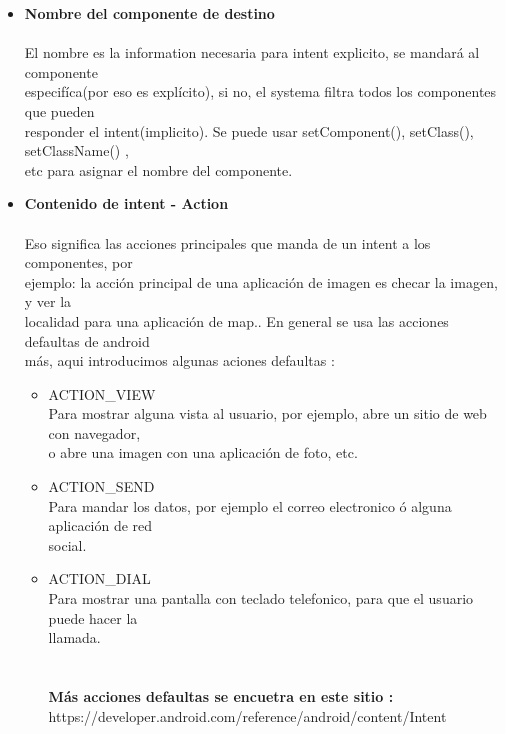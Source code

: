 \documentclass[a4paper]{article}
\begin{document}
\begin{itemize}
\item \textbf{Nombre del componente de destino} \\ \\
El nombre es la information necesaria para intent explicito, se mandará al componente \\[0.3em] especifíca(por eso es explícito), si no, el systema filtra todos los componentes que pueden \\[0.3em] responder el intent(implicito). Se puede usar setComponent(), setClass(), setClassName() , \\[0.3em] etc para asignar el nombre del componente. \\ 

\item \textbf{Contenido de intent - Action} \\ \\
Eso significa las acciones principales que manda de un intent a los componentes, por \\[0.3em] ejemplo: la acción principal de una aplicación de imagen es 
checar la imagen, y ver la \\[0.3em] localidad para una aplicación de map.. En general se usa las acciones defaultas de android \\[0.3em] más, aqui introducimos algunas aciones defaultas :

\begin{itemize}
  \item{ACTION\_VIEW}  \\[0.6em] 
Para mostrar alguna vista al usuario, por ejemplo, abre un sitio de web con navegador, \\[0.3em] o  abre una imagen con una aplicación de foto, etc.
   \item{ACTION\_SEND} \\[0.6em]
Para mandar los datos, por ejemplo el correo electronico ó alguna aplicación de red \\[0.3em] social.

   \item{ACTION\_DIAL} \\[0.6em]
Para mostrar una pantalla con teclado telefonico, para que el usuario puede hacer la \\[0.3em] llamada.\\ \\ \\
\textbf{Más acciones defaultas se encuetra en este sitio : \\[0.7em] }
https://developer.android.com/reference/android/content/Intent \\
\end{itemize}

\end{itemize}
\end{document}
